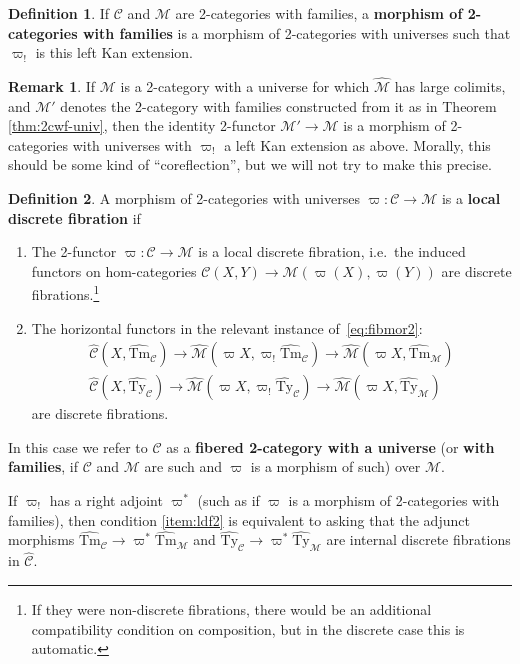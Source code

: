 \documentclass[10pt]{article}
\theoremstyle{definition}
\newtheorem{definition}{Definition}
\newtheorem{remark}{Remark}
\newcommand\M{\mathcal{M}}
\newcommand\Mhat{\widehat{\mathcal{M}}}
\newcommand\Mtyhat{{\widehat{\mathrm{Ty}}_{\M}}}
\newcommand\Mtmhat{{\widehat{\mathrm{Tm}}_{\M}}}
\newcommand\C{\mathcal{C}}
\newcommand\Chat{{\widehat{\mathcal{C}}}}
\newcommand\Ctyhat{{\widehat{\mathrm{Ty}}}_{\C}}
\newcommand\Ctmhat{{\widehat{\mathrm{Tm}}}_{\C}}
\newcommand\vp{\varpi}
\newcommand\vpst{\vp^*}
\newcommand\vpsh{\vp_!}
\begin{document}
\begin{definition}
  If $\C$ and $\M$ are 2-categories with families, a \textbf{morphism of 2-categories with families} is a morphism of 2-categories with universes such that $\vpsh$ is this left Kan extension.
\end{definition}

\begin{remark}
  If $\M$ is a 2-category with a universe for which $\Mhat$ has large colimits, and $\M'$ denotes the 2-category with families constructed from it as in Theorem \ref{thm:2cwf-univ}, then the identity 2-functor $\M'\to\M$ is a morphism of 2-categories with universes with $\vpsh$ a left Kan extension as above.
  Morally, this should be some kind of ``coreflection'', but we will not try to make this precise.
\end{remark}

\begin{definition}\label{thm:2cwf-ldf}
  A morphism of 2-categories with universes $\vp : \C\to\M$ is a \textbf{local discrete fibration} if
  \begin{enumerate}
  \item The 2-functor $\vp:\C\to\M$ is a local discrete fibration, i.e.\ the induced functors on hom-categories $\C(X,Y) \to \M(\vp(X),\vp(Y))$ are discrete fibrations.\footnote{If they were non-discrete fibrations, there would be an additional compatibility condition on composition, but in the discrete case this is automatic.}\label{item:ldf1}
  \item The horizontal functors in the relevant instance of~\eqref{eq:fibmor2}:
    \begin{gather*}
      \Chat(X,\Ctmhat) \to \Mhat(\vp X, \vpsh \Ctmhat) \to \Mhat(\vp X, \Mtmhat)\\
      \Chat(X,\Ctyhat) \to \Mhat(\vp X, \vpsh \Ctyhat) \to \Mhat(\vp X, \Mtyhat)
    \end{gather*}
    are discrete fibrations.\label{item:ldf2}
  \end{enumerate}
  In this case we refer to $\C$ as a \textbf{fibered 2-category with a universe} (or \textbf{with families}, if $\C$ and $\M$ are such and $\vp$ is a morphism of such) over $\M$.
\end{definition}

If $\vpsh$ has a right adjoint $\vpst$ (such as if $\vp$ is a morphism of 2-categories with families), then condition \ref{item:ldf2} is equivalent to asking that the adjunct morphisms $\Ctmhat \to \vpst \Mtmhat$ and $\Ctyhat \to \vpst \Mtyhat$ are internal discrete fibrations in $\Chat$.
\end{document}
